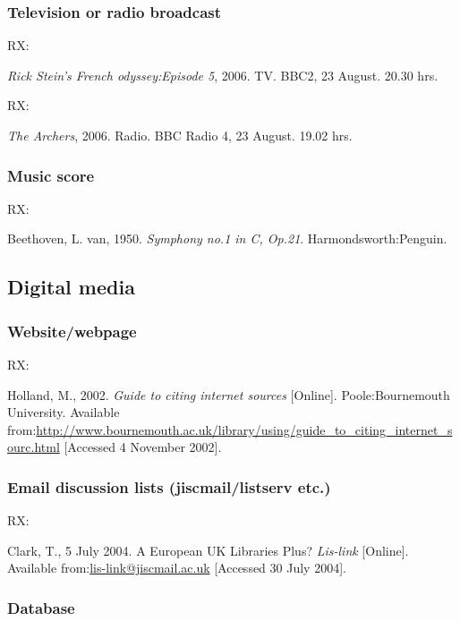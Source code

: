 \subsubsection*{Television or radio broadcast}

RX: \cite{rsfo2006ep5}

\emph{Rick Stein's French odyssey:\@ Episode 5}, 2006. TV. BBC2, 23 August. 20.30 hrs.


RX: \cite{archers20060823}

\emph{The Archers}, 2006. Radio. BBC Radio 4, 23 August. 19.02 hrs.



\subsubsection*{Music score}

RX: \cite{beethoven1950symph1}

Beethoven, L. van, 1950. \emph{Symphony no.1 in C, Op.21}. Harmondsworth:\@ Penguin.



\subsection{Digital media}

\subsubsection*{Website\slash webpage}

RX: \cite{holland2002gci}

Holland, M., 2002. \emph{Guide to citing internet sources} [Online]. Poole:\@ Bournemouth University. Available from:\@ \url{http://www.bournemouth.ac.uk/library/using/guide_to_citing_internet_sourc.html} [Accessed 4 November 2002].



\subsubsection*{Email discussion lists (jiscmail\slash listserv etc.)}

RX: \cite{clark2004euk}

Clark, T., 5 July 2004. A European UK Libraries Plus? \emph{Lis-link} [Online]. Available from:\@ \url{lis-link@jiscmail.ac.uk} [Accessed 30 July 2004].



\subsubsection*{Database}

